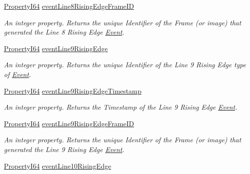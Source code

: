\begin{DoxyCompactItemize}
\hyperlink{group___common_interface_ga81749b2696755513663492664a18a893}{Property\+I64} \hyperlink{classmv_i_m_p_a_c_t_1_1acquire_1_1_gen_i_cam_1_1_event_control_a921bbd8b9dca1440fcec818f651f6ff6}{event\+Line8\+Rising\+Edge\+Frame\+I\+D}
\begin{DoxyCompactList}\small\item\em An integer property. Returns the unique Identifier of the Frame (or image) that generated the Line 8 Rising Edge \hyperlink{classmv_i_m_p_a_c_t_1_1acquire_1_1_event}{Event}. \end{DoxyCompactList}\item 
\hyperlink{group___common_interface_ga81749b2696755513663492664a18a893}{Property\+I64} \hyperlink{classmv_i_m_p_a_c_t_1_1acquire_1_1_gen_i_cam_1_1_event_control_aae241d88190705bcef9fdf9661cb51c3}{event\+Line9\+Rising\+Edge}
\begin{DoxyCompactList}\small\item\em An integer property. Returns the unique Identifier of the Line 9 Rising Edge type of \hyperlink{classmv_i_m_p_a_c_t_1_1acquire_1_1_event}{Event}. \end{DoxyCompactList}\item 
\hyperlink{group___common_interface_ga81749b2696755513663492664a18a893}{Property\+I64} \hyperlink{classmv_i_m_p_a_c_t_1_1acquire_1_1_gen_i_cam_1_1_event_control_affce32c95f199264b835c8be5a8d1651}{event\+Line9\+Rising\+Edge\+Timestamp}
\begin{DoxyCompactList}\small\item\em An integer property. Returns the Timestamp of the Line 9 Rising Edge \hyperlink{classmv_i_m_p_a_c_t_1_1acquire_1_1_event}{Event}. \end{DoxyCompactList}\item 
\hyperlink{group___common_interface_ga81749b2696755513663492664a18a893}{Property\+I64} \hyperlink{classmv_i_m_p_a_c_t_1_1acquire_1_1_gen_i_cam_1_1_event_control_a58caac0e560404a6253550ae991c8292}{event\+Line9\+Rising\+Edge\+Frame\+I\+D}
\begin{DoxyCompactList}\small\item\em An integer property. Returns the unique Identifier of the Frame (or image) that generated the Line 9 Rising Edge \hyperlink{classmv_i_m_p_a_c_t_1_1acquire_1_1_event}{Event}. \end{DoxyCompactList}\item 
\hyperlink{group___common_interface_ga81749b2696755513663492664a18a893}{Property\+I64} \hyperlink{classmv_i_m_p_a_c_t_1_1acquire_1_1_gen_i_cam_1_1_event_control_ae3a2db71f9d4bcec3abefb3bf9908e96}{event\+Line10\+Rising\+Edge}

\end{DoxyCompactItemize}
